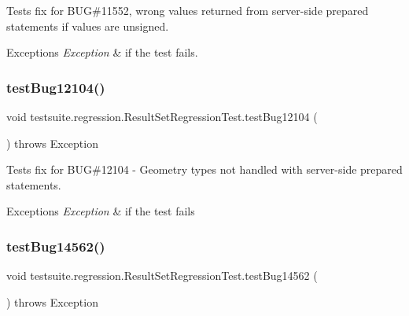 Tests fix for B\+UG\#11552, wrong values returned from server-\/side prepared statements if values are unsigned.


\begin{DoxyExceptions}{Exceptions}
{\em Exception} & if the test fails. \\
\hline
\end{DoxyExceptions}
\mbox{\label{classtestsuite_1_1regression_1_1_result_set_regression_test_a5967a08c14eff5f2158876c10b97da26}} 
\subsubsection{\texorpdfstring{test\+Bug12104()}{testBug12104()}}
{\footnotesize\ttfamily void testsuite.\+regression.\+Result\+Set\+Regression\+Test.\+test\+Bug12104 (\begin{DoxyParamCaption}{ }\end{DoxyParamCaption}) throws Exception}

Tests fix for B\+UG\#12104 -\/ Geometry types not handled with server-\/side prepared statements.


\begin{DoxyExceptions}{Exceptions}
{\em Exception} & if the test fails \\
\hline
\end{DoxyExceptions}
\mbox{\label{classtestsuite_1_1regression_1_1_result_set_regression_test_ac1d2232b96f37d2f6ce4fbf52264cff8}} 
\subsubsection{\texorpdfstring{test\+Bug14562()}{testBug14562()}}
{\footnotesize\ttfamily void testsuite.\+regression.\+Result\+Set\+Regression\+Test.\+test\+Bug14562 (\begin{DoxyParamCaption}{ }\end{DoxyParamCaption}) throws Exception}

